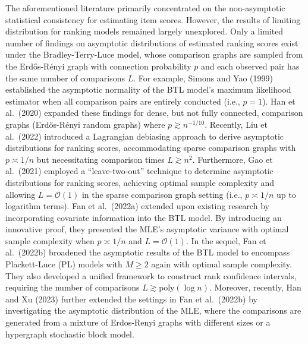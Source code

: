 The aforementioned literature primarily concentrated on the non-asymptotic statistical consistency for estimating item scores. However, the results of limiting distribution for ranking models remained largely unexplored. Only a limited number of findings on asymptotic distributions of estimated ranking scores exist under the Bradley-Terry-Luce model, whose comparison graphs are sampled from the Erdős-Rényi graph with connection probability \(p\) and each observed pair has the same number of comparisons \(L\). For example, Simons and Yao (1999) established the asymptotic normality of the BTL model's maximum likelihood estimator when all comparison pairs are entirely conducted (i.e., \(p = 1\)). Han et al.~(2020) expanded these findings for dense, but not fully connected, comparison graphs (Erdős-Rényi random graphs) where \(p \gtrsim n^{- 1 / 10}\). Recently, Liu et al.~(2022) introduced a Lagrangian debiasing approach to derive asymptotic distributions for ranking scores, accommodating sparse comparison graphs with \(p \asymp 1 / n\) but necessitating comparison times \(L \gtrsim n^2\). Furthermore, Gao et al.~(2021) employed a ``leave-two-out'' technique to determine asymptotic distributions for ranking scores, achieving optimal sample complexity and allowing \(L = \mathcal{O}(1)\) in the sparse comparison graph setting (i.e., \(p \asymp 1 / n\) up to logarithm terms). Fan et al.~(2022a) extended upon existing research by incorporating covariate information into the BTL model. By introducing an innovative proof, they presented the MLE's asymptotic variance with optimal sample complexity when \(p \asymp 1 / n\) and \(L = \mathcal{O}(1)\). In the sequel, Fan et al.~(2022b) broadened the asymptotic results of the BTL model to encompass Plackett-Luce (PL) models with \(M \geq 2\) again with optimal sample complexity. They also developed a unified framework to construct rank confidence intervals, requiring the number of comparisons \(L \gtrsim \mathrm{poly}(\log n)\). Moreover, recently, Han and Xu (2023) further extended the settings in Fan et al.~(2022b) by investigating the asymptotic distribution of the MLE, where the comparisons are generated from a mixture of Erdos-Renyi graphs with different sizes or a hypergraph stochastic block model.

